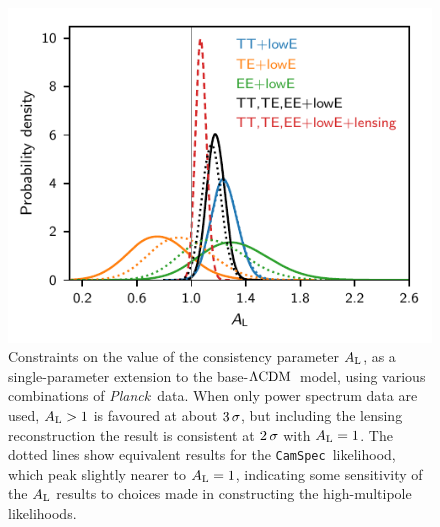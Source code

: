 \documentclass[longauth,traditabstract]{aa}
\def\Planck{\textit{Planck}}
\def\,{\thinspace}
\newcommand{\camspec}{{\tt CamSpec}}
\newcommand{\Alens}{A_{\rm L}}
\providecommand{\LCDM}{{$\rm{\Lambda CDM}$}}
\newcommand{\planck}{\Planck}
\begin{document}
\begin{figure}[t]
\centering
\includegraphics[]{Alens.pdf}
\caption{
Constraints on the value of the consistency parameter $\Alens$, as a single-parameter extension to the base-\LCDM\ model, using various combinations of \planck\ data. When only power spectrum data are used, $\Alens>1$ is favoured at about $3\,\sigma$, but including the lensing reconstruction the result is consistent at $2\,\sigma$ with $\Alens=1$. The dotted lines show equivalent results for the \camspec\ likelihood, which peak slightly nearer to $\Alens=1$, indicating some sensitivity of the $\Alens$ results to choices made in constructing the high-multipole likelihoods.
\label{fig:Alens}
}
\end{figure}
\end{document}
